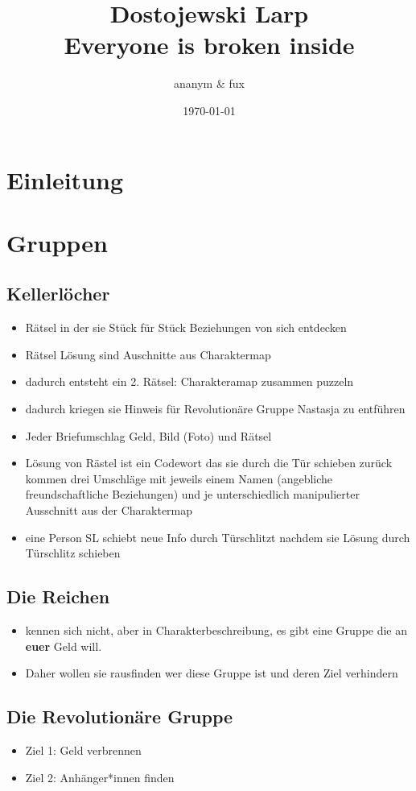 \documentclass[12pt, a4paper, openany]{report}
\title{
  {\large{Dostojewski Larp}}\\
    {Everyone is broken inside}\\
    {\bigskip}
}
\author{ananym \& fux}
\date{\today}
\begin{document}
\maketitle 
\tableofcontents
\chapter{Einleitung}

\chapter{Gruppen}
\section{Kellerlöcher}
\begin{itemize}
\item Rätsel in der sie Stück für Stück Beziehungen von sich entdecken 
\item Rätsel Lösung sind Auschnitte aus Charaktermap
\item dadurch entsteht ein 2. Rätsel: Charakteramap zusammen puzzeln 
\item dadurch kriegen sie Hinweis für Revolutionäre Gruppe Nastasja zu entführen
\item Jeder Briefumschlag Geld, Bild (Foto) und Rätsel 
\item Lösung von Rästel ist ein Codewort das sie durch die Tür schieben zurück kommen drei Umschläge mit jeweils einem Namen (angebliche freundschaftliche Beziehungen) und je unterschiedlich manipulierter Ausschnitt aus der Charaktermap
\item eine Person SL schiebt neue Info durch Türschlitzt nachdem sie Lösung durch Türschlitz schieben 
\end{itemize}
 
\section{Die Reichen}
\begin{itemize}
\item kennen sich nicht, aber in Charakterbeschreibung, es gibt eine Gruppe die an \textbf{euer} Geld will. 
\item Daher wollen sie rausfinden wer diese Gruppe ist und deren Ziel verhindern
\end{itemize}

\section{Die Revolutionäre Gruppe}
\begin{itemize}
\item Ziel 1: Geld verbrennen 
\item Ziel 2: Anhänger*innen finden
\end{itemize}
\end{document}
